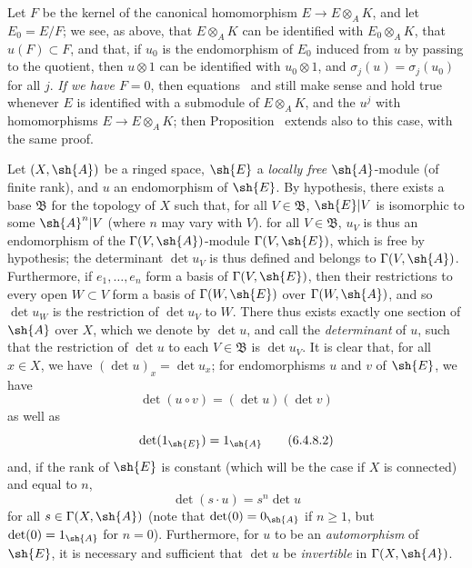 \begin{remark}[6.4.7]
Let $F$ be the kernel of the canonical homomorphism $E\to E\otimes_A K$, and let $E_0=E/F$;
we see, as above, that $E\otimes_A K$ can be identified with $E_0\otimes_A K$, that $u(F)\subset F$, and that, if $u_0$ is the endomorphism of $E_0$ induced from $u$ by passing to the quotient, then $u\otimes1$ can be identified with $u_0\otimes1$, and $\sigma_j(u)=\sigma_j(u_0)$ for all $j$.
\emph{If we have $F=0$}, then equations~ and  still make sense and hold true whenever $E$ is identified with a submodule of $E\otimes_A K$, and the $u^j$ with homomorphisms $E\to E\otimes_A K$;
then Proposition~ extends also to this case, with the same proof.
\end{remark}

\begin{env}[6.4.8]
\label{II.6.4.8}
Let $(X,\sh{A})$ be a ringed space, $\sh{E}$ a \emph{locally free} $\sh{A}$-module (of finite rank), and $u$ an endomorphism of $\sh{E}$.
By hypothesis, there exists a base $\mathfrak{B}$ for the topology of $X$ such that, for all $V\in\mathfrak{B}$, $\sh{E}|V$ is isomorphic to some $\sh{A}^n|V$ (where $n$ may vary with $V$).
for all $V\in\mathfrak{B}$, $u_V$ is thus an endomorphism of the $\Gamma(V,\sh{A})$-module $\Gamma(V,\sh{E})$, which is free by hypothesis;
the determinant $\det u_V$ is thus defined and belongs to $\Gamma(V,\sh{A})$.
Furthermore, if $e_1,\ldots,e_n$ form a basis of $\Gamma(V,\sh{E})$, then their restrictions to every open $W\subset V$ form a basis of $\Gamma(W,\sh{E})$ over $\Gamma(W,\sh{A})$, and so $\det u_W$ is the restriction of $\det u_V$ to $W$.
There thus exists exactly one section of $\sh{A}$ over $X$, which we denote by $\det u$, and call the \emph{determinant} of $u$, such that the restriction of $\det u$ to each $V\in\mathfrak{B}$ is $\det u_V$.
It is clear that, for all $x\in X$, we have $(\det u)_x=\det u_x$;
for endomorphisms $u$ and $v$ of $\sh{E}$, we have
\[
\label{II.6.4.8.1}
  \det(u\circ v) = (\det u)(\det v)
\tag{6.4.8.1}
\]
as well as
\[
\label{II.6.4.8.2}
  \det(1_{\sh{E}}) = 1_{\sh{A}}
\tag{6.4.8.2}
\]
and, if the rank of $\sh{E}$ is constant (which will be the case  if $X$ is connected) and equal to $n$,
\[
\label{II.6.4.8.3}
  \det(s\cdot u) = s^n\det u
\tag{6.4.8.3}
\]
for all $s\in\Gamma(X,\sh{A})$ (note that $\det(0)=0_{\sh{A}}$ if $n\geq1$, but $\det(0)=1_{\sh{A}}$ for $n=0$).
Furthermore, for $u$ to be an \emph{automorphism} of $\sh{E}$, it is necessary and sufficient that $\det u$ be \emph{invertible} in $\Gamma(X,\sh{A})$.


\end{env}

